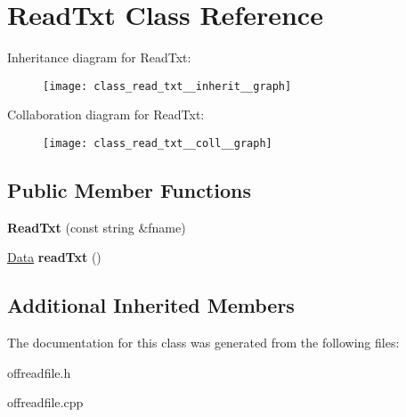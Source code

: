 \hypertarget{class_read_txt}{}\section{Read\+Txt Class Reference}
\label{class_read_txt}


Inheritance diagram for Read\+Txt\+:\nopagebreak
\begin{figure}[H]
\begin{center}
\leavevmode
\texttt{[image: class\_read\_txt\_\_inherit\_\_graph]}
\end{center}
\end{figure}


Collaboration diagram for Read\+Txt\+:\nopagebreak
\begin{figure}[H]
\begin{center}
\leavevmode
\texttt{[image: class\_read\_txt\_\_coll\_\_graph]}
\end{center}
\end{figure}
\subsection*{Public Member Functions}
\begin{DoxyCompactItemize}
\item 
\mbox{\label{class_read_txt_af66a9abde28671c08264b28c26646c2a}} 
{\bfseries Read\+Txt} (const string \&fname)
\item 
\mbox{\label{class_read_txt_adee9ad45d93fce109d24edaaa834a568}} 
\hyperlink{struct_data}{Data} {\bfseries read\+Txt} ()
\end{DoxyCompactItemize}
\subsection*{Additional Inherited Members}


The documentation for this class was generated from the following files\+:\begin{DoxyCompactItemize}
\item 
offreadfile.\+h\item 
offreadfile.\+cpp\end{DoxyCompactItemize}
